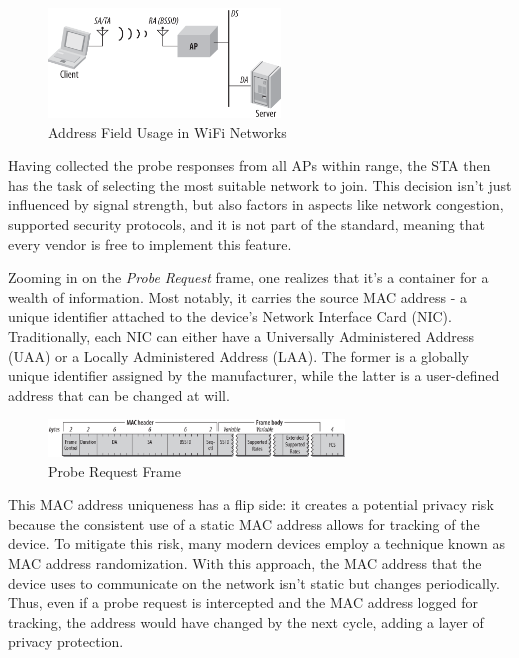 \documentclass{article}
\begin{document}
\begin{figure}[h]
    \centering
    \includegraphics[width=0.55\textwidth]{assets/address-field-usage.png}
    \caption{Address Field Usage in WiFi Networks}
    \label{fig:address-field}
\end{figure}

Having collected the probe responses from all APs within range, the STA then has the task of selecting the most suitable network to join. This decision isn't just influenced by signal strength, but also factors in aspects like network congestion, supported security protocols, and it is not part of the standard, meaning that every vendor is free to implement this feature.

Zooming in on the \textit{Probe Request} frame, one realizes that it's a container for a wealth of information. Most notably, it carries the source MAC address - a unique identifier attached to the device's Network Interface Card (NIC). Traditionally, each NIC can either have a Universally Administered Address (UAA) or a Locally Administered Address (LAA). The former is a globally unique identifier assigned by the manufacturer, while the latter is a user-defined address that can be changed at will.

\begin{figure}[h]
    \centering
    \includegraphics[width=0.7\textwidth]{assets/probe-request-frame.png}
    \caption{Probe Request Frame}
    \label{fig:probe-request-frame}
\end{figure}

This MAC address uniqueness has a flip side: it creates a potential privacy risk because the consistent use of a static MAC address allows for tracking of the device. To mitigate this risk, many modern devices employ a technique known as MAC address randomization. With this approach, the MAC address that the device uses to communicate on the network isn't static but changes periodically. Thus, even if a probe request is intercepted and the MAC address logged for tracking, the address would have changed by the next cycle, adding a layer of privacy protection.
\end{document}
